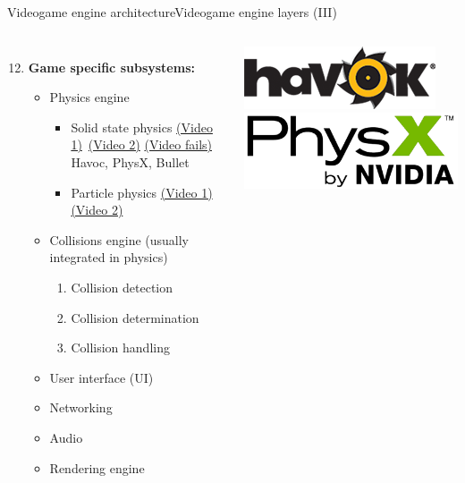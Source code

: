\documentclass[10pt,compress]{beamer} %
\begin{document}
\begin{frame}[plain]{Videogame engine architecture}{Videogame engine layers (III)}
    \begin{columns}
	\begin{enumerate}
	\setcounter{enumi}{11}
	\item \textbf{Game specific subsystems:} 
		\begin{itemize}
		\item Physics engine
			\begin{itemize}
			\item Solid state physics \href{https://www.youtube.com/watch?v=PfezSJB21vk}{(Video 1)} \href{https://www.youtube.com/watch?v=q0xCYm6B9yE}{(Video 2)} \href{https://www.youtube.com/watch?v=Nj9TGIrgGVI}{(Video fails)}\\
			Havoc, PhysX, Bullet\\
			\item Particle physics \href{https://www.youtube.com/watch?v=x8Fo2slT2WA}{(Video 1)} \href{https://www.youtube.com/watch?v=Jl54WZtm0QE}{(Video 2)}
			\end{itemize}
		\item Collisions engine (usually integrated in physics)
			\begin{enumerate}[i]
			\item Collision detection
			\item Collision determination
			\item Collision handling
			\end{enumerate}
		\item User interface (UI)
		\item Networking
		\item Audio
		\item Rendering engine
		\end{itemize}
	\end{enumerate}
			\centering\includegraphics[width=0.9\linewidth]{figs/havok}\\\smallskip
			\centering\includegraphics[width=0.9\linewidth]{figs/physx.png}\\\smallskip

\end{columns}
\end{frame}
\end{document}
